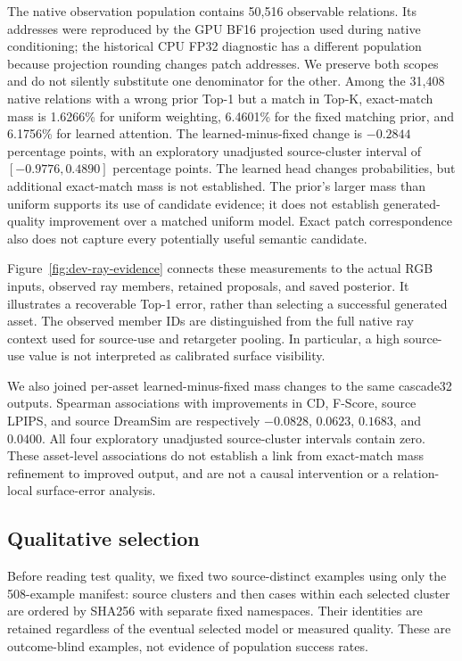 \documentclass[10pt]{article}
\begin{document}
The native observation population contains 50,516 observable relations.
Its addresses were reproduced by the GPU BF16 projection used during native
conditioning; the historical CPU FP32 diagnostic has a different population
because projection rounding changes patch addresses. We preserve both scopes
and do not silently substitute one denominator for the other. Among the
31,408 native relations with a wrong prior Top-1 but a match in Top-K,
exact-match mass is 1.6266\% for uniform weighting, 6.4601\% for the fixed
matching prior, and 6.1756\% for learned attention. The learned-minus-fixed
change is $-0.2844$ percentage points, with an exploratory unadjusted
source-cluster interval of $[-0.9776,0.4890]$ percentage points. The learned
head changes probabilities, but additional exact-match mass is not established.
The prior's larger mass than uniform supports its use of candidate evidence;
it does not establish generated-quality improvement over a matched uniform
model. Exact patch correspondence also does not capture every potentially
useful semantic candidate.

Figure~\ref{fig:dev-ray-evidence} connects these measurements to the actual
RGB inputs, observed ray members, retained proposals, and saved posterior.
It illustrates a recoverable Top-1 error, rather than selecting a successful
generated asset. The observed member IDs are distinguished from the full
native ray context used for source-use and retargeter pooling. In particular,
a high source-use value is not interpreted as calibrated surface visibility.


We also joined per-asset learned-minus-fixed mass changes to the same
cascade32 outputs. Spearman associations with improvements in CD, F-Score,
source LPIPS, and source DreamSim are respectively $-0.0828$, $0.0623$,
$0.1683$, and $0.0400$. All four exploratory unadjusted source-cluster
intervals contain zero. These asset-level associations do not establish a
link from exact-match mass refinement to improved output, and are not a
causal intervention or a relation-local surface-error analysis.

\subsection{Qualitative selection}
Before reading test quality, we fixed two source-distinct examples using only
the 508-example manifest: source clusters and then cases within each selected
cluster are ordered by SHA256 with separate fixed namespaces. Their identities
are retained regardless of the eventual selected model or measured quality.
These are outcome-blind examples, not evidence of population success rates.
\end{document}
